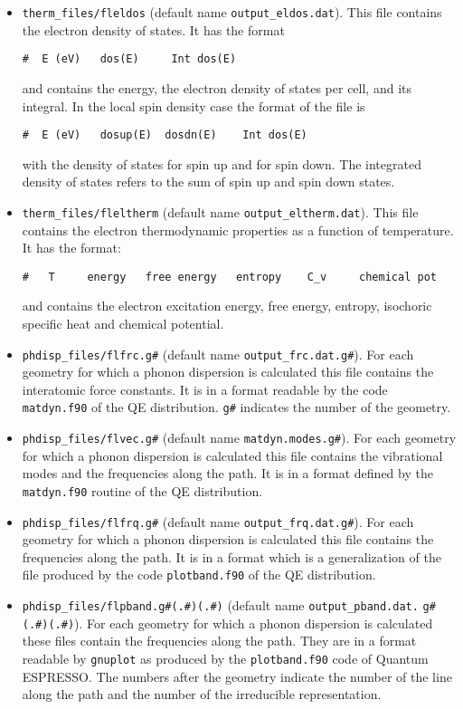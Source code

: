\documentclass[12pt,a4paper,twoside]{report}
\def\qe{{\sc Quantum ESPRESSO}}
\begin{document}
\begin{itemize}
\item 
\texttt{therm\_files/fleldos} (default name \texttt{output\_eldos.dat}).
This file contains the electron density of states. It has the format
\begin{verbatim}
#  E (eV)   dos(E)     Int dos(E)
\end{verbatim}
and contains the energy, the electron density of states per cell, and
its integral. In the local spin density case the format of the file is
\begin{verbatim}
#  E (eV)   dosup(E)  dosdn(E)    Int dos(E)
\end{verbatim}
with the density of states for spin up and for spin down. The integrated
density of states refers to the sum of spin up and spin down states.

\item 
\texttt{therm\_files/fleltherm} (default name \texttt{output\_eltherm.dat}).
This file contains the electron thermodynamic properties as a function of
temperature. It has the format:
\begin{verbatim}
#   T     energy   free energy   entropy    C_v     chemical pot
\end{verbatim}
and contains the electron excitation energy, free energy, entropy, 
isochoric specific heat and chemical potential.

\item 
\texttt{phdisp\_files/flfrc.g\#} (default name \texttt{output\_frc.dat.g\#}).
For each geometry for which a phonon dispersion is calculated this file
contains the interatomic force constants. It is in a format readable by
the code \texttt{matdyn.f90} of the QE distribution. \texttt{g\#} indicates 
the number of the geometry.

\item 
\texttt{phdisp\_files/flvec.g\#} (default name 
\texttt{matdyn.modes.g\#}). For each geometry for which a phonon dispersion
is calculated this file contains the vibrational modes and the frequencies
along the path. It is in a format defined by the \texttt{matdyn.f90} routine 
of the QE distribution.

\item 
\texttt{phdisp\_files/flfrq.g\#} (default name \texttt{output\_frq.dat.g\#}).
For each geometry for which a phonon dispersion is calculated this file
contains the frequencies along the path. It is in a format which is a 
generalization of the file produced by the code \texttt{plotband.f90} of 
the QE distribution.

\item 
\texttt{phdisp\_files/flpband.g\#(.\#)(.\#)} 
(default name \texttt{output\_pband.dat.} \texttt{g\#(.\#)(.\#)}).
For each geometry for which a phonon dispersion is calculated these files
contain the frequencies along the path. They are in a format readable by
\texttt{gnuplot} as produced by the \texttt{plotband.f90} code of \qe.
The numbers after the geometry indicate the number of the line 
along the path and the number of the irreducible representation.


\end{itemize}
\end{document}
